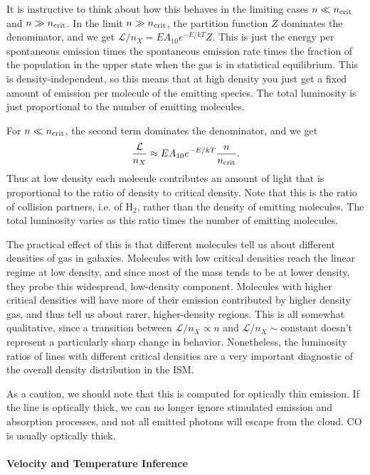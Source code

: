 It is instructive to think about how this behaves in the limiting cases $n \ll n_{\rm crit}$ and $n\gg n_{\rm crit}$. In the limit $n\gg n_{\rm crit}$, the partition function $Z$ dominates the denominator, and we get $\mathcal{L}/n_X = E A_{10} e^{-E/kT}{Z}$. This is just the energy per spontaneous emission times the spontaneous emission rate times the fraction of the population in the upper state when the gas is in statistical equilibrium. This is density-independent, so this means that at high density you just get a fixed amount of emission per molecule of the emitting species. The total luminosity is just proportional to the number of emitting molecules.

For $n \ll n_{\rm crit}$, the second term dominates the denominator, and we get
\begin{equation}
\frac{\mathcal{L}}{n_X} \approx E A_{10} e^{-E/kT} \frac{n}{n_{\rm crit}}.
\end{equation}
Thus at low density each molecule contributes an amount of light that is proportional to the ratio of density to critical density. Note that this is the ratio of collision partners, i.e. of H$_2$, rather than the density of emitting molecules. The total luminosity varies as this ratio times the number of emitting molecules.

The practical effect of this is that different molecules tell us about different densities of gas in galaxies. Molecules with low critical densities reach the linear regime at low density, and since most of the mass tends to be at lower density, they probe this widespread, low-density component. Molecules with higher critical densities will have more of their emission contributed by higher density gas, and thus tell us about rarer, higher-density regions. This is all somewhat qualitative, since a transition between $\mathcal{L}/n_X \propto n$ and $\mathcal{L}/n_X \sim\mbox{constant}$ doesn't represent a particularly sharp change in behavior. Nonetheless, the luminosity ratios of lines with different critical densities are a very important diagnostic of the overall density distribution in the ISM.

As a caution, we should note that this is computed for optically thin emission. If the line is optically thick, we can no longer ignore stimulated emission and absorption processes, and not all emitted photons will escape from the cloud. CO is usually optically thick.

\paragraph{Velocity and Temperature Inference}

